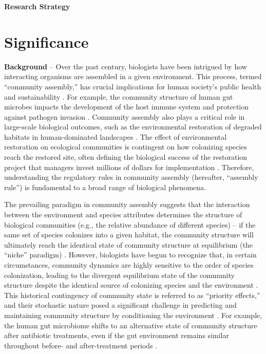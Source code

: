 \documentclass[12pt, class=article, crop=false]{standalone}
\begin{document}
\textbf{Research Strategy}

\section{Significance}

\textbf{Background} --
Over the past century, biologists have been intrigued by how interacting organisms are assembled in a given environment.
This process, termed ``community assembly,'' has crucial implications for human society's public health and sustainability \citep{leibold_metacommunity_2004, palmer_ecological_2014, fukami_historical_2015, ojima_priority_2022}.
For example, the community structure of human gut microbes impacts the development of the host immune system and protection against pathogen invasion \citep{fierer_animalcules_2012}.
Community assembly also plays a critical role in large-scale biological outcomes, such as the environmental restoration of degraded habitats in human-dominated landscapes \citep{palmer_ecological_2014, koning_network_2020, terui_emergent_2021}.
The effect of environmental restoration on ecological communities is contingent on how colonizing species reach the restored site, often defining the biological success of the restoration project that managers invest millions of dollars for implementation \citep{palmer_ecological_2014, weidlich_priority_2021}.
Therefore, understanding the regulatory rules in community assembly (hereafter, ``assembly rule'') is fundamental to a broad range of biological phenomena.

The prevailing paradigm in community assembly suggests that the interaction between the environment and species attributes determines the structure of biological communities  (e.g., the relative abundance of different species) -- if the same set of species colonizes into a given habitat, the community structure will ultimately reach the identical state of community structure at equilibrium (the ``niche'' paradigm) \citep{chase_community_2003}.
However, biologists have begun to recognize that, in certain circumstances, community dynamics are highly sensitive to the order of species colonization, leading to the divergent equilibrium state of the community structure despite the identical source of colonizing species and the environment \citep{chase_community_2003, fukami_historical_2015}.
This historical contingency of community state is referred to as ``priority effects,'' and their stochastic nature posed a significant challenge in predicting and maintaining community structure by conditioning the environment \citep{fukami_historical_2015}.
For example, the human gut microbiome shifts to an alternative state of community structure after antibiotic treatments, even if the gut environment remains similar throughout before- and after-treatment periods \citep{dominguez-bello_development_2011}.
\end{document}
